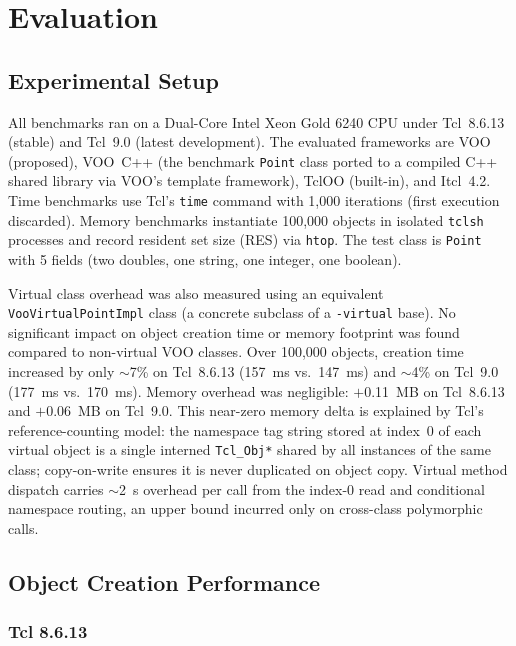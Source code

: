 \section{Evaluation}

\subsection{Experimental Setup}

All benchmarks ran on a Dual-Core Intel Xeon Gold 6240 CPU under Tcl~8.6.13 (stable)
and Tcl~9.0 (latest development). The evaluated frameworks are VOO (proposed), VOO~C++
(the benchmark \texttt{Point} class ported to a compiled C++ shared library via VOO's
template framework), TclOO (built-in), and Itcl~4.2. Time benchmarks use Tcl's
\texttt{time} command with 1,000 iterations (first execution discarded). Memory
benchmarks instantiate 100,000 objects in isolated \texttt{tclsh} processes and record resident set size
(RES) via \texttt{htop}. The test class is \texttt{Point} with 5 fields (two doubles, one
string, one integer, one boolean).

Virtual class overhead was also measured using an equivalent \texttt{VooVirtualPointImpl}
class (a concrete subclass of a \texttt{-virtual} base). No significant impact on object
creation time or memory footprint was found compared to non-virtual VOO classes. Over
100,000 objects, creation time increased by only $\sim$7\% on Tcl~8.6.13 (157~ms
vs.\ 147~ms) and $\sim$4\% on Tcl~9.0 (177~ms vs.\ 170~ms). Memory overhead was
negligible: $+$0.11~MB on Tcl~8.6.13 and $+$0.06~MB on Tcl~9.0. This near-zero memory
delta is explained by Tcl's reference-counting model: the namespace tag string stored at
index~0 of each virtual object is a single interned \texttt{Tcl\_Obj*} shared by all
instances of the same class; copy-on-write ensures it is never duplicated on object copy.
Virtual method dispatch carries $\sim$2~\textmu s overhead per call from the index-0 read
and conditional namespace routing, an upper bound incurred only on cross-class polymorphic
calls.

\subsection{Object Creation Performance}

\subsubsection*{Tcl 8.6.13}

